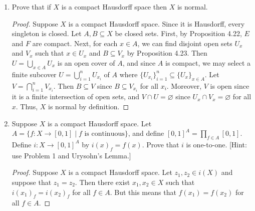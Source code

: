 \documentclass[11pt,oneside,english]{amsart}
\theoremstyle{definition}
\begin{document}
\begin{enumerate}
\begin{center}
\end{center}

\item Prove that if $X$ is a compact Hausdorff space then $X$ is normal.

\begin{proof}
Suppose $X$ is a compact Hausdorff space. Since it is Hausdorff, every singleton is closed. Let $A,B\subseteq X$ be closed sets. First, by Proposition 4.22, $E$ and $F$ are compact. Next, for each $x\in A$, we can find disjoint open sets $U_x$ and $V_x$ such that $x\in U_x$ and $B\subseteq V_x$ by Proposition 4.23. Then $U=\bigcup_{x\in A}U_x$ is an open cover of $A$, and since $A$ is compact, we may select a finite subcover $U=\bigcup_{i=1}^n U_{x_i}$ of $A$ where $\{U_{x_i}\}_{i=1}^n\subseteq\{U_x\}_{x\in A}$. Let $V=\bigcap_{i=1}^n V_{x_i}$. Then $B\subseteq V$ since $B\subseteq V_{x_i}$ for all $x_i$. Moreover, $V$ is open since it is a finite intersection of open sets, and $V\cap U=\varnothing$ since $U_x\cap V_x=\varnothing$ for all $x$. Thus, $X$ is normal by definition.
\end{proof}

\item Suppose $X$ is a compact Hausdorff space. Let $A=\{f:X\rightarrow [0,1]\mid f\text{ is continuous}\}$, and define $[0,1]^A=\prod_{f\in A}[0,1]$. Define $i:X\rightarrow [0,1]^A$ by $i(x)_f=f(x)$. Prove that $i$ is one-to-one. [Hint: use Problem 1 and Urysohn's Lemma.]

\begin{proof}
Suppose $X$ is a compact Hausdorff space. Let $z_1,z_2\in i(X)$ and suppose that $z_1=z_2$. Then there exist $x_1,x_2\in X$ such that $i(x_1)_f=i(x_2)_f$ for all $f\in A$. But this means that $f(x_1)=f(x_2)$ for all $f\in A$. 



\end{proof}
\end{enumerate}
\end{document}
